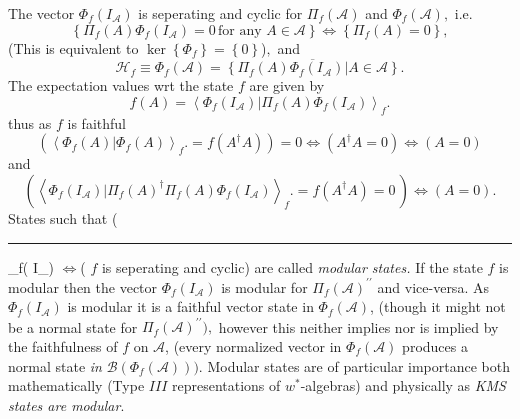 \documentclass[aps,preprint]{revtex4}%
\providecommand{\U}[1]{\protect\rule{.1in}{.1in}}
\begin{document}
The vector $\Phi_{f}\left(  I_{\mathcal{A}}\right)  $ is seperating and cyclic
for $\Pi_{f}\left(  \mathcal{A}\right)  $ and $\Phi_{f}\left(  \mathcal{A}%
\right)  ,$ i.e.
\begin{equation}
\left\{  \Pi_{f}\left(  A\right)  \Phi_{f}\left(  I_{\mathcal{A}}\right)
=0\,\text{for any }A\in\mathcal{A}\right\}  \Leftrightarrow\left\{  \Pi
_{f}\left(  A\right)  =0\right\}  ,
\end{equation}
(This is equivalent to $\ker\left\{  \Phi_{f}\right\}  =\left\{  0\right\}
$)$,$ and
\begin{equation}
\mathcal{H}_{f}\equiv\Phi_{f}\left(  \mathcal{A}\right)  =\overline{\left\{
\left.  \Pi_{f}\left(  A\right)  \Phi_{f}\left(  I_{\mathcal{A}}\right)
\right\vert A\in\mathcal{A}\right\}  }.
\end{equation}
The expectation values wrt the state $f$ are given by
\begin{equation}
f\left(  A\right)  =\left\langle \left.  \Phi_{f}\left(  I_{\mathcal{A}%
}\right)  \right\vert \Pi_{f}\left(  A\right)  \Phi_{f}\left(  I_{\mathcal{A}%
}\right)  \right\rangle _{f}.
\end{equation}
thus as $f$ is faithful
\begin{equation}
\left(  \left\langle \left.  \Phi_{f}\left(  A\right)  \right\vert \Phi
_{f}\left(  A\right)  \right\rangle _{f}.=f\left(  A^{\dagger}A\right)
\right)  =0\Leftrightarrow\left(  A^{\dagger}A=0\right)  \Leftrightarrow
\left(  A=0\right)
\end{equation}
and
\begin{equation}
\left(  \left\langle \left.  \Phi_{f}\left(  I_{\mathcal{A}}\right)
\right\vert \Pi_{f}\left(  A\right)  ^{\dagger}\Pi_{f}\left(  A\right)
\Phi_{f}\left(  I_{\mathcal{A}}\right)  \right\rangle _{f}.=f\left(
A^{\dagger}A\right)  =0\,\right)  \Leftrightarrow\left(  A=0\right)  .
\end{equation}
States such that (\U{e308}_f\left(  I_\right)   $\Leftrightarrow$( $f$ is seperating and cyclic) are called
\emph{modular states. }If the state\emph{ }$f$ is modular then the vector
$\Phi_{f}\left(  I_{\mathcal{A}}\right)  $ is modular for $\Pi_{f}\left(
\mathcal{A}\right)  ^{\prime\prime}$ and vice-versa$.$ As $\Phi_{f}\left(
I_{\mathcal{A}}\right)  $ is modular it is a faithful vector state in
$\Phi_{f}\left(  \mathcal{A}\right)  $, (though it might not be a normal state
for $\Pi_{f}\left(  \mathcal{A}\right)  ^{\prime\prime}),$ however this
neither implies nor is implied by the faithfulness of $f$ on $\mathcal{A}$,
(every normalized vector in $\Phi_{f}\left(  \mathcal{A}\right)  $ produces a
normal state \emph{in} $\mathcal{B}\left(  \Phi_{f}\left(  \mathcal{A}\right)
\right)  ).$ Modular states are of particular importance both mathematically
(Type $III$ representations of $w^{\ast}$-algebras) and physically as
\emph{KMS states are modular}.
\end{document}
